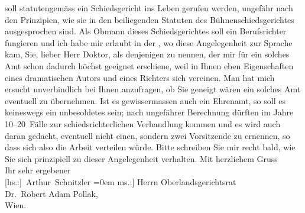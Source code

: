 \begin{ledgroupsized}[t]{13cm}
               soll  statutengemäss ein Schiedsgericht ins Leben
               gerufen werden, ungefähr nach den Prinzipien, wie sie in den beiliegenden Statuten
               des Bühnenschiedsgerichtes ausgesprochen sind. Als Obmann dieses Schiedsgerichtes
               soll ein Berufsrichter fungieren und ich habe mir erlaubt in der \label{K_L02356-1v}\label{K_L02356-1h}, wo diese Angelegenheit zur Sprache kam, Sie, lieber Herr Doktor, als
               denjenigen zu nennen, der mir für ein solches Amt schon dadurch höchst geeignet
               erschiene, weil in Ihnen eben Eigenschaften eines dramatischen Autors und eines
               Richters sich vereinen. Man hat mich ersucht unverbindlich bei Ihnen anzufragen, ob
               Sie geneigt wären ein solches Amt eventuell zu übernehmen. Ist es gewissermassen auch
               ein Ehrenamt, so soll es keineswegs ein unbesoldetes sein; nach ungefährer Berechnung
               dürften im Jahre 10–20 Fälle zur schiedsrichterlichen Verhandlung kommen und es wird
               auch daran gedacht, eventuell nicht einen, sondern zwei Vorsitzende zu ernennen, so
               dass sich also die Arbeit verteilen würde. Bitte schreiben Sie mir recht bald, wie
               Sie sich prinzipiell zu dieser Angelegenheit verhalten.\pend
           \pstart
           Mit herzlichem Gruss{\\[\baselineskip]}Ihr sehr ergebener{\\[\baselineskip]}\spacefill\mbox{{[}hs.:{]} Arthur Schnitzler}\pend
           \leftskip=0em{}\pstart
           \noindent{}{[}ms.:{]} Herrn Oberlandsgerichtsrat{\\}Dr. Robert Adam Pollak,{\\}Wien.\pend
           
         
         \endnumbering{}\end{ledgroupsized}  \newcommand{\dateiname}{L02356}\newcommand{\titel}{Arthur Schnitzler an Robert Adam, 28. 10. 1920}\newcommand{\editorInnen}{Martin Anton Müller und Gerd-Hermann Susen}
      